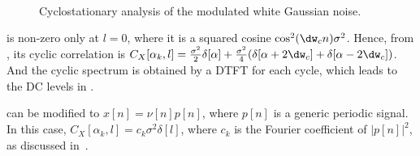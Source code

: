 
\begin{figure}[!htb]
  \begin{center}
    \\
  \end{center}
  \caption{Cyclostationary analysis of the modulated white Gaussian noise.\label{fig:modulatedNoise}}
\end{figure}


 is non-zero only at $l=0$, where it is 
a squared cosine $\cos^2(\dw_c n) \sigma^2$.  Hence, from , 
its cyclic correlation is $C_{X}[\alpha_k,l]=\frac{\sigma^2}{2} \delta[\alpha] + \frac{\sigma^2}{4}(\delta[\alpha+2\dw_c ] + \delta[\alpha-2\dw_c] )$. And the cyclic spectrum is obtained by
a DTFT for each cycle, which leads to the DC levels in .

 can be modified to $x[n] = \nu[n] p[n]$, where $p[n]$ is a generic periodic signal. In this case, $C_{X}[\alpha_k,l]=c_k \sigma^2 \delta[l]$, where $c_k$
is the Fourier coefficient of $|p[n]|^2$, as discussed in~\cite{Antoni07}.

